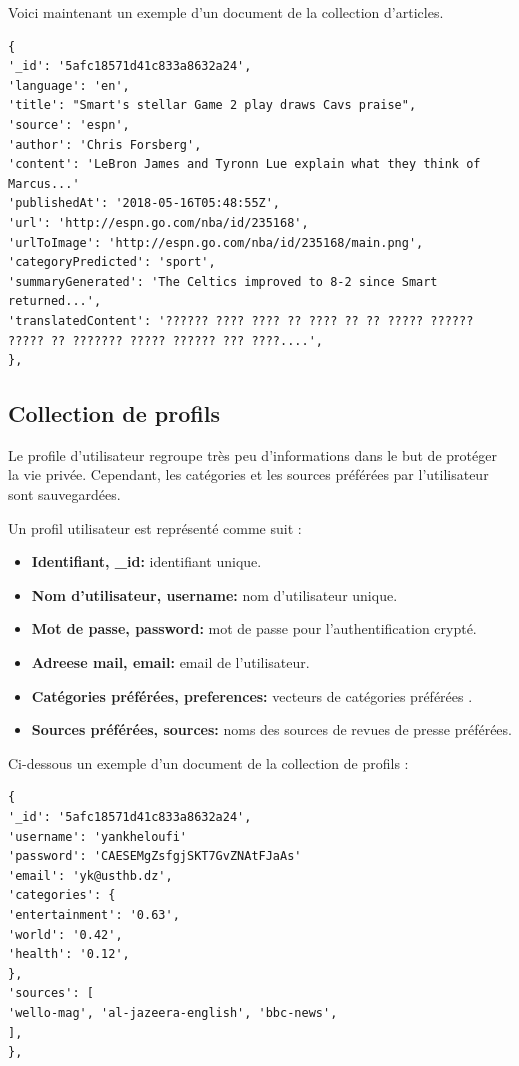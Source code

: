 Voici maintenant un exemple d'un document de la collection d'articles.
\begin{lstlisting}[style=code]
{
'_id': '5afc18571d41c833a8632a24', 
'language': 'en',
'title': "Smart's stellar Game 2 play draws Cavs praise", 
'source': 'espn', 
'author': 'Chris Forsberg', 
'content': 'LeBron James and Tyronn Lue explain what they think of Marcus...'
'publishedAt': '2018-05-16T05:48:55Z', 
'url': 'http://espn.go.com/nba/id/235168',
'urlToImage': 'http://espn.go.com/nba/id/235168/main.png',  
'categoryPredicted': 'sport', 
'summaryGenerated': 'The Celtics improved to 8-2 since Smart returned...', 
'translatedContent': '?????? ???? ???? ?? ???? ?? ?? ????? ?????? ????? ?? ??????? ????? ?????? ??? ????....', 
},
\end{lstlisting}

\subsection{Collection de profils}
Le profile d'utilisateur regroupe très peu d'informations dans le but de protéger la vie privée. Cependant, les catégories et les sources préférées par l'utilisateur sont sauvegardées. 

Un profil utilisateur est représenté comme suit :
\begin{itemize}
    \item \textbf{Identifiant, \textquotedbl  \_id\textquotedbl : } identifiant unique.
    \item \textbf{Nom d'utilisateur, \textquotedbl  username\textquotedbl : } nom d'utilisateur unique.
    \item \textbf{Mot de passe, \textquotedbl  password\textquotedbl : } mot de passe pour l'authentification crypté.
    \item \textbf{Adreese mail, \textquotedbl  email\textquotedbl : } email de l'utilisateur.
    \item \textbf{Catégories préférées, \textquotedbl  preferences\textquotedbl : } vecteurs de catégories préférées .
    \item \textbf{Sources préférées, \textquotedbl  sources\textquotedbl : } noms des sources de revues de presse préférées. 
\end{itemize}

Ci-dessous un exemple d'un document de la collection de profils :
\begin{lstlisting}[style=code]
{
'_id': '5afc18571d41c833a8632a24', 
'username': 'yankheloufi'
'password': 'CAESEMgZsfgjSKT7GvZNAtFJaAs'
'email': 'yk@usthb.dz',
'categories': {
'entertainment': '0.63',
'world': '0.42',
'health': '0.12',
},
'sources': [
'wello-mag', 'al-jazeera-english', 'bbc-news', 
],
},
\end{lstlisting}







